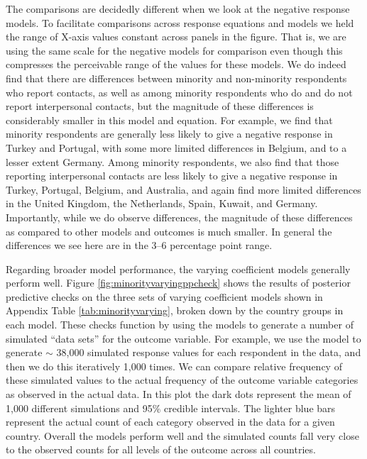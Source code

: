 The comparisons are decidedly different when we look at the negative response models. To facilitate comparisons across response equations and models we held the range of X-axis values constant across panels in the figure. That is, we are using the same scale for the negative models for comparison even though this compresses the perceivable range of the values for these models.  We do indeed find that there are differences between minority and non-minority respondents who report contacts, as well as among minority respondents who do and do not report interpersonal contacts, but the magnitude of these differences is considerably smaller in this model and equation. For example, we find that minority respondents are generally less likely to give a negative response in Turkey and Portugal, with some more limited differences in Belgium, and to a lesser extent Germany. Among minority respondents, we also find that those reporting interpersonal contacts are less likely to give a negative response in Turkey, Portugal, Belgium, and Australia, and again find more limited differences in the United Kingdom, the Netherlands, Spain, Kuwait, and Germany. Importantly, while we do observe differences, the magnitude of these differences as compared to other models and outcomes is much smaller. In general the differences we see here are in the 3--6 percentage point range. 

Regarding broader model performance, the varying coefficient models generally perform well. Figure \ref{fig:minorityvaryingppcheck} shows the results of posterior predictive checks on the three sets of varying coefficient models shown in Appendix Table \ref{tab:minorityvarying}, broken down by the country groups in each model. These checks function by using the models to generate a number of simulated ``data sets'' for the outcome variable. For example, we use the model to generate $\sim$ 38,000 simulated response values for each respondent in the data, and then we do this iteratively 1,000 times. We can compare relative frequency of these simulated values to the actual frequency of the outcome variable categories as observed in the actual data. In this plot the dark dots represent the mean of 1,000 different simulations and 95\% credible intervals. The lighter blue bars represent the actual count of each category observed in the data for a given country. Overall the models perform well and the simulated counts fall very close to the observed counts for all levels of the outcome across all countries.





